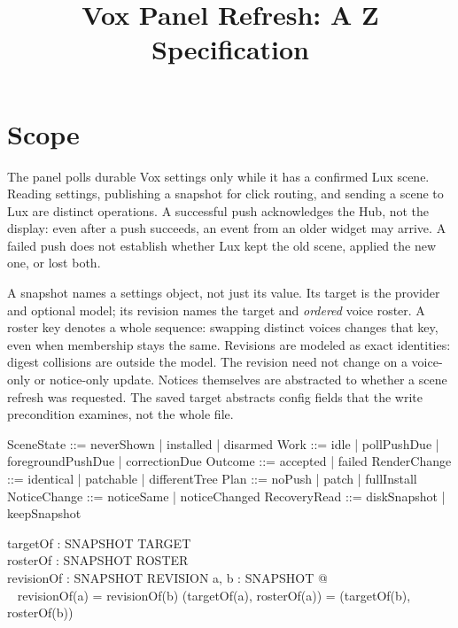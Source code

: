 \documentclass[a4paper,10pt,fleqn]{article}
\begin{document}
\title{Vox Panel Refresh: A Z Specification}
\maketitle

\section{Scope}

The panel polls durable Vox settings only while it has a confirmed Lux
scene. Reading settings, publishing a snapshot for click routing, and
sending a scene to Lux are distinct operations. A successful push
acknowledges the Hub, not the display: even after a push succeeds, an
event from an older widget may arrive. A failed push does not establish
whether Lux kept the old scene, applied the new one, or lost both.

A snapshot names a settings object, not just its value. Its target is
the provider and optional model; its revision names the target and
\emph{ordered} voice roster. A roster key denotes a whole sequence:
swapping distinct voices changes that key, even when membership stays
the same. Revisions are modeled as exact identities:
digest collisions are outside the model. The revision need not change
on a voice-only or notice-only update. Notices themselves are abstracted
to whether a scene refresh was requested. The saved target abstracts
config fields that the write precondition examines, not the whole file.

\begin{zed}
\also
  SceneState ::= neverShown | installed | disarmed
\also
  Work ::= idle | pollPushDue | foregroundPushDue | correctionDue
\also
  Outcome ::= accepted | failed
\also
  RenderChange ::= identical | patchable | differentTree
\also
  Plan ::= noPush | patch | fullInstall
\also
  NoticeChange ::= noticeSame | noticeChanged
\also
  RecoveryRead ::= diskSnapshot | keepSnapshot
\end{zed}

\begin{axdef}
  targetOf : SNAPSHOT \fun TARGET \\
  rosterOf : SNAPSHOT \fun ROSTER \\
  revisionOf : SNAPSHOT \fun REVISION
\where
  \forall a, b : SNAPSHOT @ \\
  \quad~ revisionOf(a) = revisionOf(b)
    \iff (targetOf(a), rosterOf(a)) = (targetOf(b), rosterOf(b))
\end{axdef}
\end{document}
